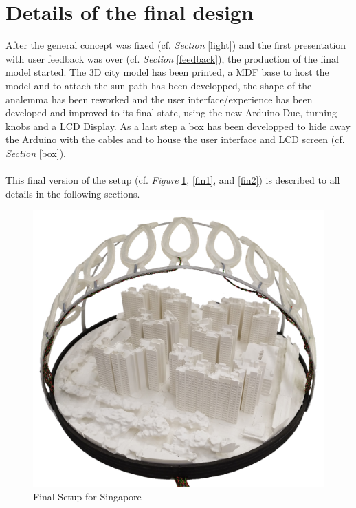 \documentclass[a4paper,9pt]{article}
\begin{document}
\newpage
\section{Details of the final design}
After the general concept was fixed (cf. \textit{Section} \ref{light}) and the first presentation with user feedback was over (cf. \textit{Section} \ref{feedback}), the production of the final model started. The 3D city model has been printed, a MDF base to host the model and to attach the sun path has been developped, the shape of the analemma has been reworked and the user interface/experience has been developed and improved to its final state, using the new Arduino Due, turning knobs and a LCD Display. As a last step a box has been developped to hide away the Arduino with the cables and to house the user interface and LCD screen (cf. \textit{Section} \ref{box}). \\
\\
This final version of the setup (cf. \textit{Figure} \ref{final}, \ref{fin1}, and \ref{fin2}) is described to all details in the following sections.
\\[1cm]
\begin{figure}[H]
    \centering
    \includegraphics[width=\linewidth]{Images/final.png}
    \caption{Final Setup for Singapore}
    \label{final}
\end{figure}
\newpage
\end{document}
